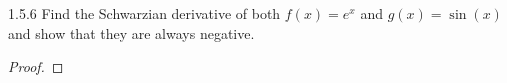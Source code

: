 \begin{problem}{1.5.6}
  Find the Schwarzian derivative of both $f(x) = e^x$ and $g(x) = \sin(x)$ and
  show that they are always negative.
\end{problem}

\begin{proof}
\end{proof}
\newpage
